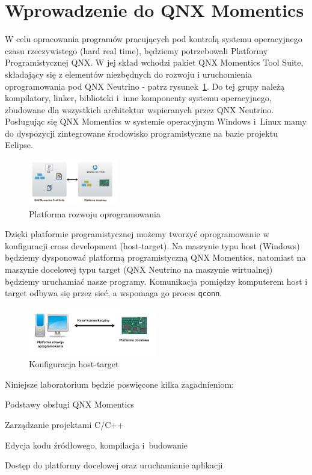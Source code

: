 \section{Wprowadzenie do QNX Momentics}


W celu opracowania programów pracujących pod kontrolą systemu operacyjnego czasu rzeczywistego (hard real time), będziemy potrzebowali Platformy Programistycznej QNX. W jej skład wchodzi pakiet QNX Momentics Tool Suite, składający się z elementów niezbędnych do rozwoju i uruchomienia oprogramowania pod QNX Neutrino - patrz rysunek~\ref{fig:qnxMomentics}. Do tej grupy należą kompilatory, linker, biblioteki i~inne komponenty systemu operacyjnego, zbudowane dla wszystkich architektur wspieranych przez QNX Neutrino. Posługując się QNX Momentics w systemie operacyjnym Windows i~Linux mamy do dyspozycji zintegrowane środowisko programistyczne na bazie projektu Eclipse.


\begin{figure}[!h]
\centering
\includegraphics[width=0.35\textwidth]{img/qnxMomentics}
\caption{Platforma rozwoju oprogramowania}
\label{fig:qnxMomentics}
\end{figure}

Dzięki platformie programistycznej możemy tworzyć oprogramowanie w konfiguracji cross development (host-target). Na maszynie typu host (Windows) będziemy dysponować platformą programistyczną QNX Momentics, natomiast na maszynie docelowej typu target (QNX Neutrino na maszynie wirtualnej) będziemy uruchamiać nasze programy. Komunikacja pomiędzy komputerem host i target odbywa się przez sieć, a wspomaga go proces \lstinline[style=MyBashStyle]{qconn}.

\begin{figure}[!h]
\centering
\includegraphics[width=0.5\textwidth]{img/konfiguracja}
\caption{Konfiguracja host-target}
\label{fig:konfiguracja}
\end{figure}

Niniejsze laboratorium będzie poswięcone kilka zagadnieniom:
\begin{myenumerate}
\item Podstawy obsługi QNX Momentics
\item Zarządzanie projektami C/C++
\item Edycja kodu źródłowego, kompilacja i~budowanie
\item Dostęp do platformy docelowej oraz uruchamianie aplikacji
\end{myenumerate}

